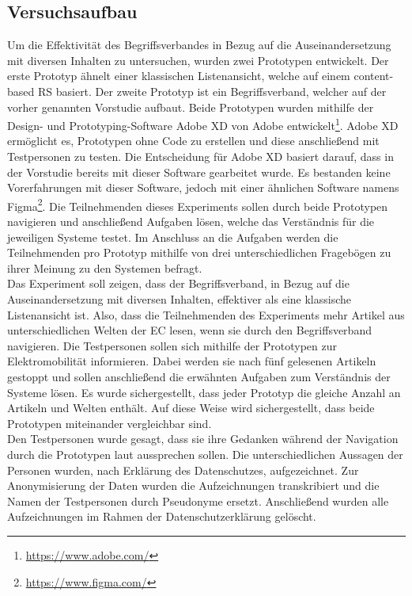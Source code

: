 \subsection{Versuchsaufbau}
Um die Effektivität des Begriffsverbandes in Bezug auf die Auseinandersetzung mit diversen Inhalten zu untersuchen, wurden zwei Prototypen entwickelt.
Der erste Prototyp ähnelt einer klassischen Listenansicht, welche auf einem content-based \ac{RS} basiert.
Der zweite Prototyp ist ein Begriffsverband, welcher auf der vorher genannten Vorstudie aufbaut.
Beide Prototypen wurden mithilfe der Design- und Prototyping-Software Adobe XD von Adobe entwickelt\footnote{\url{https://www.adobe.com/}}.
Adobe XD ermöglicht es, Prototypen ohne Code zu erstellen und diese anschließend mit Testpersonen zu testen.
Die Entscheidung für Adobe XD basiert darauf, dass in der Vorstudie bereits mit dieser Software gearbeitet wurde.
Es bestanden keine Vorerfahrungen mit dieser Software, jedoch mit einer ähnlichen Software namens Figma\footnote{\url{https://www.figma.com/}}.
Die Teilnehmenden dieses Experiments sollen durch beide Prototypen navigieren und anschließend Aufgaben lösen, welche das Verständnis für die jeweiligen Systeme testet.
Im Anschluss an die Aufgaben werden die Teilnehmenden pro Prototyp mithilfe von drei unterschiedlichen Fragebögen zu ihrer Meinung zu den Systemen befragt.\\

Das Experiment soll zeigen, dass der Begriffsverband, in Bezug auf die Auseinandersetzung mit diversen Inhalten, effektiver als eine klassische Listenansicht ist.
Also, dass die Teilnehmenden des Experiments mehr Artikel aus unterschiedlichen Welten der \ac{EC} lesen, wenn sie durch den Begriffsverband navigieren.
Die Testpersonen sollen sich mithilfe der Prototypen zur Elektromobilität informieren.
Dabei werden sie nach fünf gelesenen Artikeln gestoppt und sollen anschließend die erwähnten Aufgaben zum Verständnis der Systeme lösen.
Es wurde sichergestellt, dass jeder Prototyp die gleiche Anzahl an Artikeln und Welten enthält.
Auf diese Weise wird sichergestellt, dass beide Prototypen miteinander vergleichbar sind.\\

Den Testpersonen wurde gesagt, dass sie ihre Gedanken während der Navigation durch die Prototypen laut aussprechen sollen.
Die unterschiedlichen Aussagen der Personen wurden, nach Erklärung des Datenschutzes, aufgezeichnet.
Zur Anonymisierung der Daten wurden die Aufzeichnungen transkribiert und die Namen der Testpersonen durch Pseudonyme ersetzt.
Anschließend wurden alle Aufzeichnungen im Rahmen der Datenschutzerklärung gelöscht.\\

